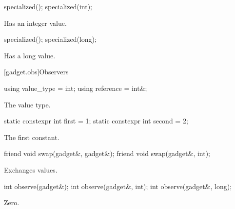 %
\begin{itemdecl}
specialized();
specialized(int);
\end{itemdecl}

\begin{itemdescr}
\pnum
\ensures
Has an integer value.
\end{itemdescr}

%
\begin{itemdecl}
specialized();
specialized(long);
\end{itemdecl}

\begin{itemdescr}
\pnum
\ensures
Has a long value.
\end{itemdescr}

[gadget.obs]{Observers}

%
%
\begin{itemdecl}
using value_type = int;
using reference = int&;
\end{itemdecl}

\begin{itemdescr}
\pnum
\remarks
The value type.
\end{itemdescr}

%
%
\begin{itemdecl}
static constexpr int first = 1;
static constexpr int second = 2;
\end{itemdecl}

\begin{itemdescr}
\pnum
\remarks
The first constant.
\end{itemdescr}

%
\begin{itemdecl}
friend void swap(gadget&, gadget&);
friend void swap(gadget&, int);
\end{itemdecl}

\begin{itemdescr}
\pnum
\effects
Exchanges values.
\end{itemdescr}

%
\begin{itemdecl}
int observe(gadget&);
int observe(gadget&, int);
int observe(gadget&, long);
\end{itemdecl}

\begin{itemdescr}
\pnum
\returns
Zero.
\end{itemdescr}
